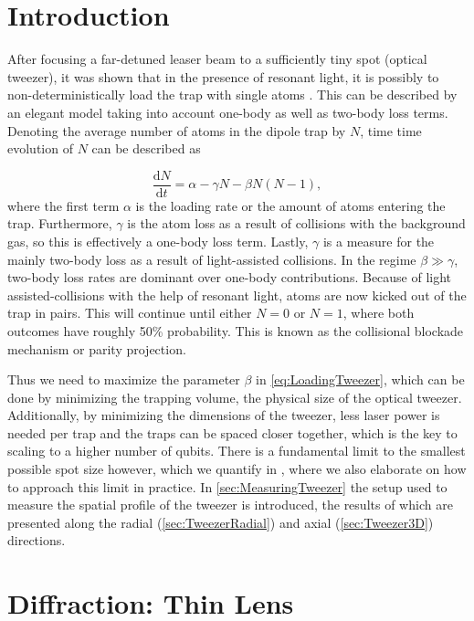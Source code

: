 \section{Introduction}\label{sec:LoadingAtoms}

After focusing a far-detuned leaser beam to a sufficiently tiny spot (optical tweezer), it was shown that in the presence of resonant light, it is possibly to non-deterministically load the trap with single atoms \cite{Schlosser2001}.
This can be described by an elegant model taking into account one-body as well as two-body loss terms. 
Denoting the average number of atoms in the dipole trap by $N$, time time evolution of $N$ can be described as \cite{Schlosser2002} 

\begin{equation}\label{eq:LoadingTweezer}
	\frac{\text{d}N}{\text{d}t} = \alpha - \gamma N - \beta N(N-1),
\end{equation}
where the first term $\alpha$ is the loading rate or the amount of atoms entering the trap.
Furthermore, $\gamma$ is the atom loss as a result of collisions with the background gas, so this is effectively a one-body loss term.
Lastly, $\gamma$ is a measure for the mainly two-body loss as a result of light-assisted collisions.
In the regime $\beta \gg \gamma$, two-body loss rates are dominant over one-body contributions. 
Because of light assisted-collisions with the help of resonant light, atoms are now kicked out of the trap in pairs.
This will continue until either $N=0$ or $N=1$, where both outcomes have roughly 50\% probability.
This is known as the collisional blockade mechanism \cite{Schlosser2001} or parity projection.

Thus we need to maximize the parameter $\beta$ in \cref{eq:LoadingTweezer}, which can be done by minimizing the trapping volume, the physical size of the optical tweezer.
Additionally, by minimizing the dimensions of the tweezer, less laser power is needed per trap and the traps can be spaced closer together, which is the key to scaling to a higher number of qubits.
There is a fundamental limit to the smallest possible spot size however, which we quantify in , where we also elaborate on how to approach this limit in practice.
In \cref{sec:MeasuringTweezer} the setup used to measure the spatial profile of the tweezer is introduced, the results of which are presented along the radial (\cref{sec:TweezerRadial}) and axial (\cref{sec:Tweezer3D}) directions.

\section{Diffraction: Thin Lens}\label{sec:DiffractionLimit}

